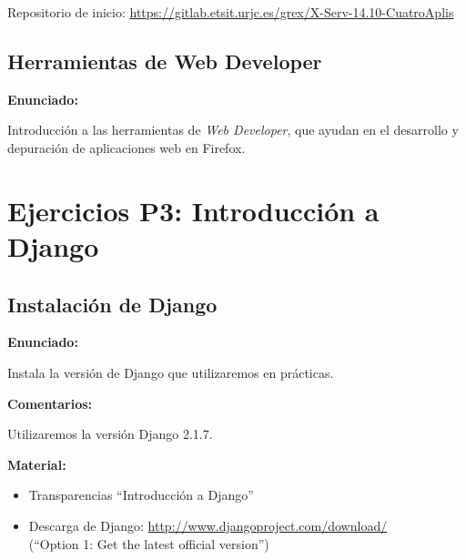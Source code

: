 Repositorio de inicio: \url{https://gitlab.etsit.urjc.es/grex/X-Serv-14.10-CuatroAplis}

\subsection{Herramientas de Web Developer}
\label{subsec:inst-web-developer}

\textbf{Enunciado:}

Introducción a las herramientas de \emph{Web Developer}, que ayudan en el desarrollo
y depuración de aplicaciones web en Firefox.

\section{Ejercicios P3: Introducción a Django}

\subsection{Instalación de Django}
\label{subsec:django-install}

\textbf{Enunciado:}

Instala la versión de Django que utilizaremos en prácticas.

\textbf{Comentarios:}

Utilizaremos la versión Django 2.1.7.

\textbf{Material:}

\begin{itemize}
\item Transparencias ``Introducción a Django''
\item Descarga de Django: \url{http://www.djangoproject.com/download/} \\
  (``Option 1: Get the latest official version'')
\end{itemize}


